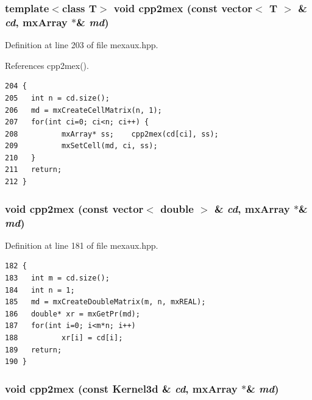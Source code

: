 \subsubsection{\setlength{\rightskip}{0pt plus 5cm}template$<$class T$>$ void cpp2mex (const vector$<$ T $>$ \& {\em cd}, mx\-Array $\ast$\& {\em md})\hspace{0.3cm}{\tt  [inline]}}\label{mexaux_8hpp_0ab29938bb0506cd7aca7c65a636bd77_0ab29938bb0506cd7aca7c65a636bd77}




Definition at line 203 of file mexaux.hpp.

References cpp2mex().

\footnotesize\begin{verbatim}204 {
205   int n = cd.size();
206   md = mxCreateCellMatrix(n, 1);
207   for(int ci=0; ci<n; ci++) {
208          mxArray* ss;    cpp2mex(cd[ci], ss);
209          mxSetCell(md, ci, ss);
210   }
211   return;
212 }
\end{verbatim}\normalsize 


\subsubsection{\setlength{\rightskip}{0pt plus 5cm}void cpp2mex (const vector$<$ double $>$ \& {\em cd}, mx\-Array $\ast$\& {\em md})\hspace{0.3cm}{\tt  [inline]}}\label{mexaux_8hpp_e65b88b901d96730062b49407d336116_e65b88b901d96730062b49407d336116}




Definition at line 181 of file mexaux.hpp.

\footnotesize\begin{verbatim}182 {
183   int m = cd.size();
184   int n = 1;
185   md = mxCreateDoubleMatrix(m, n, mxREAL);
186   double* xr = mxGetPr(md);
187   for(int i=0; i<m*n; i++)
188          xr[i] = cd[i];
189   return;
190 }
\end{verbatim}\normalsize 


\subsubsection{\setlength{\rightskip}{0pt plus 5cm}void cpp2mex (const {\bf Kernel3d} \& {\em cd}, mx\-Array $\ast$\& {\em md})\hspace{0.3cm}{\tt  [inline]}}\label{mexaux_8hpp_f4e39e1059d79e624d0734e4c60c6690_f4e39e1059d79e624d0734e4c60c6690}




